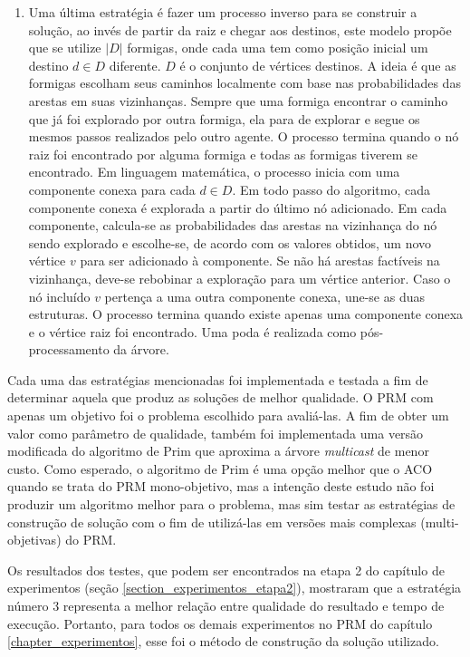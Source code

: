 \begin{enumerate}
	\item Uma última estratégia é fazer um processo inverso para se construir a solução, ao invés de partir da raiz e chegar aos destinos, este modelo propõe que se utilize $|D|$ formigas, onde cada uma tem como posição inicial um destino $d \in D$ diferente. $D$ é o conjunto de vértices destinos. A ideia é que as formigas escolham seus caminhos localmente com base nas probabilidades das arestas em suas vizinhanças. Sempre que uma formiga encontrar o caminho que já foi explorado por outra formiga, ela para de explorar e segue os mesmos passos realizados pelo outro agente. O processo termina quando o nó raiz foi encontrado por alguma formiga e todas as formigas tiverem se encontrado. Em linguagem matemática, o processo inicia com uma componente conexa para cada $d \in D$. Em todo passo do algoritmo, cada componente conexa é explorada a partir do último nó adicionado. Em cada componente, calcula-se as probabilidades das arestas na vizinhança do nó sendo explorado e escolhe-se, de acordo com os valores obtidos, um novo vértice $v$ para ser adicionado à componente. Se não há arestas factíveis na vizinhança, deve-se rebobinar a exploração para um vértice anterior. Caso o nó incluído $v$ pertença a uma outra componente conexa, une-se as duas estruturas. O processo termina quando existe apenas uma componente conexa e o vértice raiz foi encontrado. Uma poda é realizada como pós-processamento da árvore. 
\end{enumerate}

Cada uma das estratégias mencionadas foi implementada e testada a fim de determinar aquela que produz as soluções de melhor qualidade. O PRM com apenas um objetivo foi o problema escolhido para avaliá-las. A fim de obter um valor como parâmetro de qualidade, também foi implementada uma versão modificada do algoritmo de Prim \cite{Prim1957} que aproxima a árvore \textit{multicast} de menor custo. Como esperado, o algoritmo de Prim é uma opção melhor que o ACO quando se trata do PRM mono-objetivo, mas a intenção deste estudo não foi produzir um algoritmo melhor para o problema, mas sim testar as estratégias de construção de solução com o fim de utilizá-las em versões mais complexas (multi-objetivas) do PRM.

Os resultados dos testes, que podem ser encontrados na etapa 2 do capítulo de experimentos (seção \ref{section_experimentos_etapa2}), mostraram que a estratégia número 3 representa a melhor relação entre qualidade do resultado e tempo de execução. Portanto, para todos os demais experimentos no PRM do capítulo \ref{chapter_experimentos}, esse foi o método de construção da solução utilizado.

